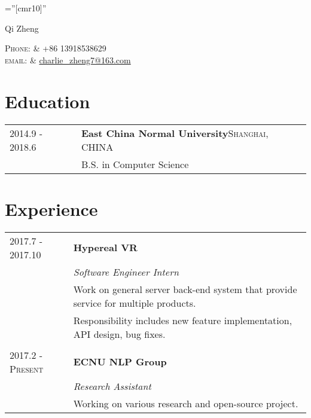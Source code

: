 \documentclass[a4paper,10pt]{article}
\begin{document}

\pagestyle{empty} %

\font\fb=''[cmr10]'' %

\par{\centering
		{\Large Qi Zheng \textsc{}
	}\par}
\centering\textsc{Phone:}     & +86 13918538629\\
\centering\textsc{email:}     & \href{mailto:charlie\_zheng7@163.com}{charlie\_zheng7@163.com}


\section{Education}
\begin{tabular}{l|p{13.3cm}}	
 2014.9 - 2018.6 & \textbf{East China Normal University}\qquad \qquad \qquad \qquad \qquad \qquad \qquad \textsc{Shanghai, CHINA}\\

& B.S. in Computer Science\\

\end{tabular}

\section{Experience}
\begin{tabular}{l|p{15cm}}
 \textsc{2017.7 - 2017.10} & \textbf{Hypereal VR}\\&\emph{Software Engineer Intern}\\&\small{Work on general server back-end system that provide service for multiple products.} \\&\small{Responsibility includes new feature implementation, API design, bug fixes.}\\\multicolumn{2}{c}{} \\
\textsc{2017.2 - Present} & \textbf{ECNU NLP Group}\\&\emph{Research Assistant}\\&\small{Working on various research and open-source project.}
\end{tabular}
\end{document}
